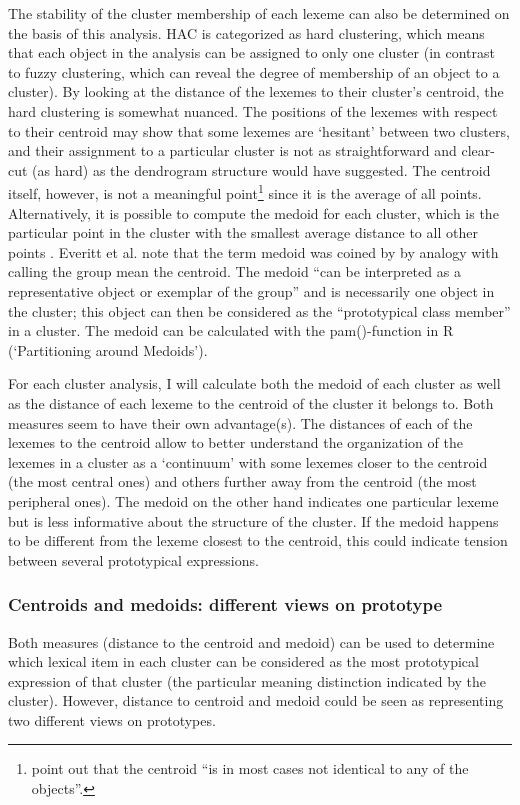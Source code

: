 The stability of the cluster membership of each lexeme can also be determined on the basis of this analysis. HAC is categorized as hard clustering, which means that each object in the analysis can be assigned to only one cluster (in contrast to fuzzy clustering, which can reveal the degree of membership of an object to a cluster). By looking at the distance of the lexemes to their cluster’s centroid, the hard clustering is somewhat nuanced. The positions of the lexemes with respect to their centroid may show that some lexemes are ‘hesitant’ between two clusters, and their assignment to a particular cluster is not as straightforward and clear-cut (as hard) as the dendrogram structure would have suggested. The centroid itself, however, is not a meaningful point\footnote{\citet[516]{manning_foundations_1999} point out that the centroid “is in most cases not identical to any of the objects”.} since it is the average of all points. Alternatively, it is possible to compute the medoid for each cluster, which is the particular point in the cluster with the smallest average distance to all other points \citep[164]{divjak_structuring_2010}. Everitt et al. \citep[113]{everitt_cluster_2011} note that the term medoid was coined by \citet{kaufman_finding_1990} by analogy with calling the group mean the centroid. The medoid “can be interpreted as a representative object or exemplar of the group” \citep[113]{everitt_cluster_2011} and is necessarily one object in the cluster; this object can then be considered as the “prototypical class member” \citep[516]{manning_foundations_1999} in a cluster. The medoid can be calculated with the pam(){}-function in R (‘Partitioning around Medoids’).

For each cluster analysis, I will calculate both the medoid of each cluster as well as the distance of each lexeme to the centroid of the cluster it belongs to. Both measures seem to have their own advantage(s). The distances of each of the lexemes to the centroid allow to better understand the organization of the lexemes in a cluster as a ‘continuum’ with some lexemes closer to the centroid (the most central ones) and others further away from the centroid (the most peripheral ones). The medoid on the other hand indicates one particular lexeme but is less informative about the structure of the cluster. If the medoid happens to be different from the lexeme closest to the centroid, this could indicate tension between several prototypical expressions.

\subsubsection{Centroids and medoids: different views on prototype}
\label{sec:3.8.1.3}
Both measures (distance to the centroid and medoid) can be used to determine which lexical item in each cluster can be considered as the most prototypical expression of that cluster (the particular meaning distinction indicated by the cluster). However, distance to centroid and medoid could be seen as representing two different views on prototypes.

